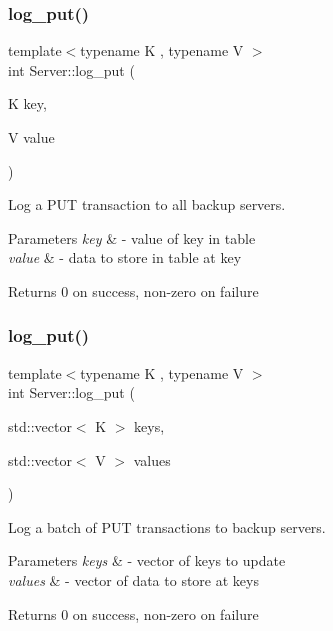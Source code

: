 \subsubsection{\texorpdfstring{log\+\_\+put()}{log\_put()}\hspace{0.1cm}{\footnotesize\ttfamily [1/2]}}
{\footnotesize\ttfamily template$<$typename K , typename V $>$ \\
int Server\+::log\+\_\+put (\begin{DoxyParamCaption}\item[{K}]{key,  }\item[{V}]{value }\end{DoxyParamCaption})\hspace{0.3cm}{\ttfamily [inline]}}

Log a P\+UT transaction to all backup servers.


\begin{DoxyParams}{Parameters}
{\em key} & -\/ value of key in table \\
\hline
{\em value} & -\/ data to store in table at key\\
\hline
\end{DoxyParams}
\begin{DoxyReturn}{Returns}
0 on success, non-\/zero on failure 
\end{DoxyReturn}
\mbox{\label{classServer_ae419ba1245066b80f42302bb0c86ed00}} 
\subsubsection{\texorpdfstring{log\+\_\+put()}{log\_put()}\hspace{0.1cm}{\footnotesize\ttfamily [2/2]}}
{\footnotesize\ttfamily template$<$typename K , typename V $>$ \\
int Server\+::log\+\_\+put (\begin{DoxyParamCaption}\item[{std\+::vector$<$ K $>$}]{keys,  }\item[{std\+::vector$<$ V $>$}]{values }\end{DoxyParamCaption})\hspace{0.3cm}{\ttfamily [inline]}}

Log a batch of P\+UT transactions to backup servers.


\begin{DoxyParams}{Parameters}
{\em keys} & -\/ vector of keys to update \\
\hline
{\em values} & -\/ vector of data to store at keys\\
\hline
\end{DoxyParams}
\begin{DoxyReturn}{Returns}
0 on success, non-\/zero on failure 
\end{DoxyReturn}
\mbox{\label{classServer_a53e470211996f969fdb03f701d3e01fd}} 
